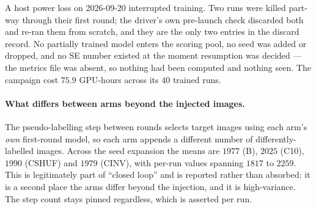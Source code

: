 \documentclass{article}
\begin{document}
A host power loss on 2026-09-20 interrupted training. Two runs were killed part-way through their
first round; the driver's own pre-launch check discarded both and re-ran them from scratch, and they
are the only two entries in the discard record. No partially trained model enters the scoring pool,
no seed was added or dropped, and no SE number existed at the moment resumption was decided --- the
metrics file was absent, so nothing had been computed and nothing seen. The campaign cost $75.9$
GPU-hours across its $40$ trained runs.

\paragraph{What differs between arms beyond the injected images.} The pseudo-labelling step between
rounds selects target images using each arm's \emph{own} first-round model, so each arm appends a
different number of differently-labelled images. Across the seed expansion the means are $1977$ (B),
$2025$ (C10), $1990$ (CSHUF) and $1979$ (CINV), with per-run values spanning $1817$ to $2259$. This
is legitimately part of ``closed loop'' and is reported rather than absorbed: it is a second place
the arms differ beyond the injection, and it is high-variance. The step count stays pinned
regardless, which is asserted per run.
\end{document}
